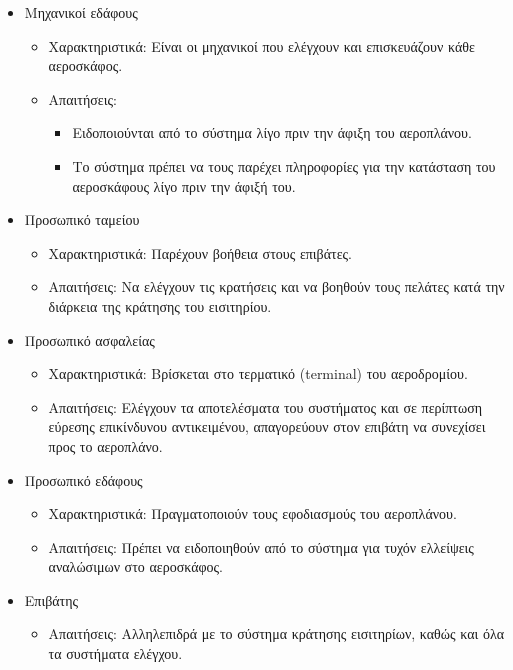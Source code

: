\documentclass[12pt]{article}
\begin{document}
\begin{itemize}
	\item Μηχανικοί εδάφους
	\begin{itemize}
		\item Χαρακτηριστικά: Είναι οι μηχανικοί που ελέγχουν και επισκευάζουν
			κάθε αεροσκάφος.
		\item Απαιτήσεις:
			\begin{itemize}
			\item Ειδοποιούνται από το σύστημα λίγο πριν την άφιξη του
				αεροπλάνου.
			\item Το σύστημα πρέπει να τους παρέχει πληροφορίες για την
				κατάσταση του αεροσκάφους λίγο πριν την άφιξή του.
			\end{itemize}
	\end{itemize}
	\item Προσωπικό ταμείου
	\begin{itemize}
		\item Χαρακτηριστικά: Παρέχουν βοήθεια στους επιβάτες.
		\item Απαιτήσεις: Να ελέγχουν τις κρατήσεις και να βοηθούν τους
			πελάτες κατά την διάρκεια της κράτησης του εισιτηρίου.
	\end{itemize}
	\item Προσωπικό ασφαλείας
	\begin{itemize}
		\item Χαρακτηριστικά: Βρίσκεται στο τερματικό (terminal) του
			αεροδρομίου.
		\item Απαιτήσεις: Ελέγχουν τα αποτελέσματα του συστήματος και
			σε περίπτωση εύρεσης επικίνδυνου αντικειμένου, απαγορεύουν
			στον επιβάτη να συνεχίσει προς το αεροπλάνο.
	\end{itemize}
	\item Προσωπικό εδάφους
	\begin{itemize}
		\item Χαρακτηριστικά: Πραγματοποιούν τους εφοδιασμούς του
			αεροπλάνου.
		\item Απαιτήσεις: Πρέπει να ειδοποιηθούν από το σύστημα για τυχόν
			ελλείψεις αναλώσιμων στο αεροσκάφος.
	\end{itemize}
	\item Επιβάτης
	\begin{itemize}
		\item Απαιτήσεις: Αλληλεπιδρά με το σύστημα κράτησης εισιτηρίων,
			καθώς και όλα τα συστήματα ελέγχου.
	\end{itemize}
\end{itemize}
\end{document}
